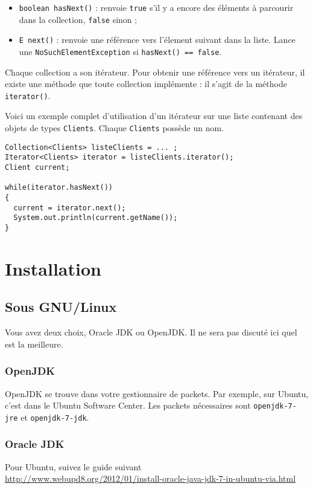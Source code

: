 \begin{itemize}
\item \lstinline{boolean hasNext()} : renvoie \lstinline|true| s'il y a encore des
éléments à parcourir dans la collection, \lstinline|false| sinon ;
\item \lstinline|E next()| : renvoie une référence vers l'élement suivant dans la liste.
Lance une \lstinline|NoSuchElementException| si \lstinline|hasNext() == false|.
\end{itemize}

Chaque collection a son itérateur. Pour obtenir une référence vers un itérateur, il existe 
une méthode que toute collection implémente : il s'agit de la méthode \lstinline|iterator()|.

Voici un exemple complet d'utilisation d'un itérateur sur une liste contenant
des objets de types \lstinline|Clients|. Chaque \lstinline|Clients| possède un nom.

\begin{lstlisting}
Collection<Clients> listeClients = ... ;
Iterator<Clients> iterator = listeClients.iterator(); 
Client current;

while(iterator.hasNext())
{
  current = iterator.next();
  System.out.println(current.getName());
}
\end{lstlisting}

\annexe
\section{Installation}
\subsection{Sous GNU/Linux}
Vous avez deux choix, Oracle JDK ou OpenJDK.
Il ne sera pas discuté ici quel est la meilleure.

\subsubsection{OpenJDK}
OpenJDK se trouve dans votre gestionnaire de packets.
Par exemple, sur Ubuntu, c'est dans le Ubuntu Software Center.
Les packets nécessaires sont \lstinline|openjdk-7-jre| et
\lstinline|openjdk-7-jdk|.

\subsubsection{Oracle JDK}
Pour Ubuntu, suivez le guide suivant\\
\url{http://www.webupd8.org/2012/01/install-oracle-java-jdk-7-in-ubuntu-via.html}

